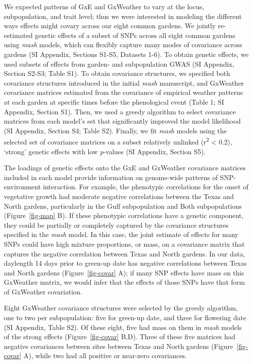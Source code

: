 \documentclass[
  9pt,
  twocolumn,
  twoside]{pnas-new}
\begin{document}
We expected patterns of GxE and GxWeather to vary at the locus,
subpopulation, and trait level; thus we were interested in modeling the
different ways effects might covary across our eight common gardens. We
jointly re-estimated genetic effects of a subset of SNPs across all
eight common gardens using \emph{mash} models, which can flexibly
capture many modes of covariance across gardens (SI Appendix, Sections
S1-S5, Datasets 1-6). To obtain genetic effects, we used subsets of
effects from garden- and subpopulation GWAS (SI Appendix, Section S2-S3;
Table S1). To obtain covariance structures, we specified both covariance
structures introduced in the initial \emph{mash} manuscript, and
GxWeather covariance matrices estimated from the covariance of empirical
weather patterns at each garden at specific times before the
phenological event (Table 1; SI Appendix, Section S1). Then, we used a
greedy algorithm to select covariance matrices from each model's set
that significantly improved the model likelihood (SI Appendix, Section
S4; Table S2). Finally, we fit \emph{mash} models using the selected set
of covariance matrices on a subset relatively unlinked
(r\textsuperscript{2} \textless{} 0.2), `strong' genetic effects with
low \emph{p}-values (SI Appendix, Section S5).

The loadings of genetic effects onto the GxE and GxWeather covariance
matrices included in each model provide information on genome-wide
patterns of SNP-environment interaction. For example, the phenotypic
correlations for the onset of vegetative growth had moderate negative
correlations between the Texas and North gardens, particularly in the
Gulf subpopulation and Both subpopulations (Figure~\ref{fig-map} B). If
these phenotypic correlations have a genetic component, they could be
partially or completely captured by the covariance structures specified
in the \emph{mash} model. In this case, the joint estimate of effects
for many SNPs could have high mixture proportions, or mass, on a
covariance matrix that captures the negative correlation between Texas
and North gardens. In our data, daylength 14 days prior to green-up date
has negative correlations between Texas and North gardens
(Figure~\ref{fig-covar} A); if many SNP effects have mass on this
GxWeather matrix, we would infer that the effects of those SNPs have
that form of GxWeather covariation.

Eight GxWeather covariance structures were selected by the greedy
algorithm, one to two per subpopulation: five for green-up date, and
three for flowering date (SI Appendix, Table S2). Of these eight, five
had mass on them in \emph{mash} models of the strong effects
(Figure~\ref{fig-covar} B,D). Three of these five matrices had negative
covariances between sites between Texas and North gardens
(Figure~\ref{fig-covar} A), while two had all positive or near-zero
covariances.
\end{document}
